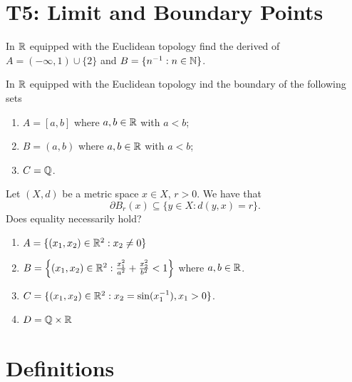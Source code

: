 \documentclass[a4paper]{article}
\begin{document}
\section*{T5: Limit and Boundary Points}

\begin{eg}
    In \( \mathbb{R}  \) equipped with the Euclidean topology find the derived of \( A = (-\infty , 1 ) \cup \{ 2  \}  \) and \( B = \{ n^{-1} : n \in \mathbb{N}  \}  \).
\end{eg}

\begin{eg}
    In \( \mathbb{R}  \) equipped with the Euclidean topology ind the boundary of the following sets
    \begin{enumerate}
        \item[(1)] \( A = [a,b]  \) where \( a,b \in \mathbb{R}  \) with \( a < b  \);
        \item[(2)] \( B = (a,b)  \) where \( a,b \in \mathbb{R}  \) with \( a < b  \);
        \item[(3)] \( C = \mathbb{Q}  \).
    \end{enumerate}
\end{eg}

\begin{eg}
   Let \( (X,d) \) be a metric space \( x \in X  \), \( r > 0  \). We have that  
   \[  \partial {B}_{r}(x) \subseteq \{ y \in X : d(y,x) = r  \}. \]
   Does equality necessarily hold?
\end{eg}

\begin{eg}
   \begin{enumerate}
       \item[(1)] \( A =  \{ ({x}_{1}, {x}_{2}) \in \mathbb{R}^{2} : {x}_{2} \neq 0  \}  \)
        \item[(2)] \( B = \Big\{ ({x}_{1}, {x}_{2}) \in \mathbb{R}^{2} : \frac{ {x}_{1}^{2}  }{ a^{2}  }  + \frac{ {x}_{2}^{2} }{  b^{2} }  < 1 \Big\} \) where \( a,b \in \mathbb{R}  \).
        \item[(3)] \( C =  \{ ({x}_{1}, {x}_{2}) \in \mathbb{R}^{2} : {x}_{2} = \sin ({x}_{1}^{-1}) , {x}_{1} > 0  \}  \).
        \item[(4)] \( D = \mathbb{Q} \times \mathbb{R}  \)
   \end{enumerate} 
\end{eg}


\section*{Definitions}
\end{document}

